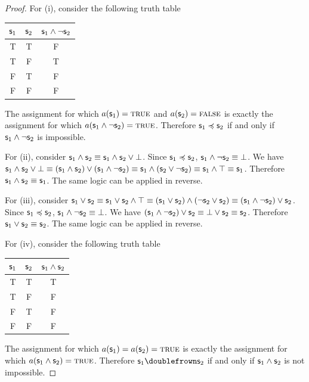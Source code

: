 \begin{mathSection}
		\begin{proof}
			For (i), consider the following truth table 
			\begin{center}
				\begin{tabular}{c|c|c}
					$\mathsf{s}_1$ & $\mathsf{s}_2$ & $\mathsf{s}_1 \wedge \neg \mathsf{s}_2$\\
					\hline
					T & T & F \\
					T & F & T \\
					F & T & F \\
					F & F & F \\
				\end{tabular}
			\end{center}
			The assignment for which $a(\mathsf{s}_1) = \textup{\textsc{true}}$ and $a(\mathsf{s}_2) = \textup{\textsc{false}}$ is exactly the assignment for which $a(\mathsf{s}_1 \wedge \neg \mathsf{s}_2) = \textup{\textsc{true}}$. Therefore $\mathsf{s}_1 \preccurlyeq \mathsf{s}_2$ if and only if $\mathsf{s}_1 \wedge \neg \mathsf{s}_2$ is impossible.
			
			For (ii), consider $\mathsf{s}_1 \wedge \mathsf{s}_2 \equiv \mathsf{s}_1 \wedge \mathsf{s}_2 \vee \bot$. Since $\mathsf{s}_1 \preccurlyeq \mathsf{s}_2$, $\mathsf{s}_1 \wedge \neg \mathsf{s}_2 \equiv \bot$. We have $\mathsf{s}_1 \wedge \mathsf{s}_2 \vee \bot \equiv ( \mathsf{s}_1 \wedge \mathsf{s}_2 ) \vee (\mathsf{s}_1 \wedge \neg \mathsf{s}_2) \equiv \mathsf{s}_1 \wedge (\mathsf{s}_2 \vee \neg \mathsf{s}_2) \equiv \mathsf{s}_1 \wedge \top \equiv \mathsf{s}_1$. Therefore $\mathsf{s}_1 \wedge \mathsf{s}_2 \equiv \mathsf{s}_1$. The same logic can be applied in reverse.
			
			For (iii), consider $\mathsf{s}_1 \vee \mathsf{s}_2 \equiv \mathsf{s}_1 \vee \mathsf{s}_2 \wedge \top \equiv (\mathsf{s}_1 \vee \mathsf{s}_2) \wedge (\neg \mathsf{s}_2 \vee \mathsf{s}_2) \equiv (\mathsf{s}_1 \wedge \neg \mathsf{s}_2) \vee \mathsf{s}_2$. Since $\mathsf{s}_1 \preccurlyeq \mathsf{s}_2$, $\mathsf{s}_1 \wedge \neg \mathsf{s}_2 \equiv \bot$. We have $(\mathsf{s}_1 \wedge \neg \mathsf{s}_2) \vee \mathsf{s}_2 \equiv \bot \vee \mathsf{s}_2 \equiv \mathsf{s}_2$. Therefore $\mathsf{s}_1 \vee \mathsf{s}_2 \equiv \mathsf{s}_2$. The same logic can be applied in reverse.
			
			For (iv), consider the following truth table 
			\begin{center}
				\begin{tabular}{c|c|c}
					$\mathsf{s}_1$ & $\mathsf{s}_2$ & $\mathsf{s}_1 \wedge \mathsf{s}_2$\\
					\hline
					T & T & T \\
					T & F & F \\
					F & T & F \\
					F & F & F \\
				\end{tabular}
			\end{center}
			The assignment for which $a(\mathsf{s}_1) = a(\mathsf{s}_2) = \textup{\textsc{true}}$ is exactly the assignment for which $a(\mathsf{s}_1 \wedge \mathsf{s}_2) = \textup{\textsc{true}}$. Therefore $\stmt_1 \comp \stmt_2$ if and only if $\mathsf{s}_1 \wedge \mathsf{s}_2$ is not impossible.
			

\end{proof}
\end{mathSection}
